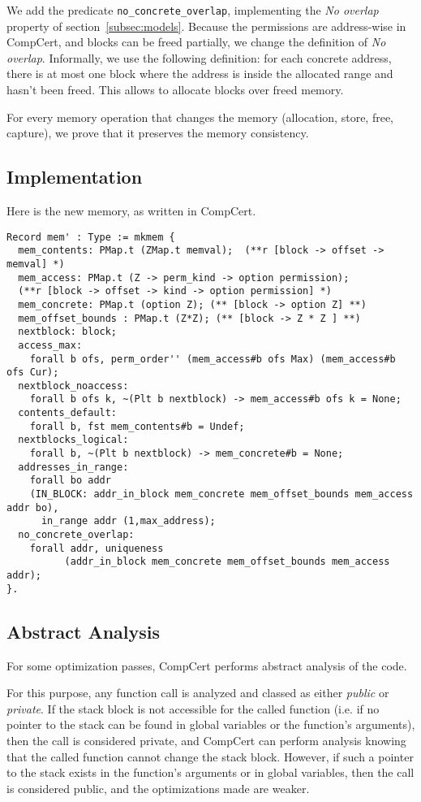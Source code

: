 We add the predicate \texttt{no\_concrete\_overlap}, implementing the \textit{No overlap} property of section~\ref{subsec:models}. Because the permissions are address-wise in CompCert, and blocks can be freed partially, we change the definition of \textit{No overlap}. Informally, we use the following definition: for each concrete address, there is at most one block where the address is inside the allocated range and hasn't been freed. This allows to allocate blocks over freed memory.

For every memory operation that changes the memory (allocation, store, free, capture), we prove that it preserves the memory consistency.

\subsection{Implementation}
Here is the new memory, as written in CompCert. 
{\footnotesize
\begin{lstlisting}
Record mem' : Type := mkmem {
  mem_contents: PMap.t (ZMap.t memval);  (**r [block -> offset -> memval] *)
  mem_access: PMap.t (Z -> perm_kind -> option permission);
  (**r [block -> offset -> kind -> option permission] *)
  mem_concrete: PMap.t (option Z); (** [block -> option Z] **)
  mem_offset_bounds : PMap.t (Z*Z); (** [block -> Z * Z ] **)
  nextblock: block;
  access_max:
    forall b ofs, perm_order'' (mem_access#b ofs Max) (mem_access#b ofs Cur);
  nextblock_noaccess:
    forall b ofs k, ~(Plt b nextblock) -> mem_access#b ofs k = None;
  contents_default:
    forall b, fst mem_contents#b = Undef;
  nextblocks_logical:
    forall b, ~(Plt b nextblock) -> mem_concrete#b = None;
  addresses_in_range:
    forall bo addr
    (IN_BLOCK: addr_in_block mem_concrete mem_offset_bounds mem_access addr bo),
      in_range addr (1,max_address);
  no_concrete_overlap:
    forall addr, uniqueness
          (addr_in_block mem_concrete mem_offset_bounds mem_access addr);
}.
\end{lstlisting}}


\subsection{Abstract Analysis}

For some optimization passes, CompCert performs abstract analysis of the code.

For this purpose, any function call is analyzed and classed as either \textit{public} or \textit{private}. If the stack block is not accessible for the called function (i.e. if no pointer to the stack can be found in global variables or the function's arguments), then the call is considered private, and CompCert can perform analysis knowing that the called function cannot change the stack block. However, if such a pointer to the stack exists in the function's arguments or in global variables, then the call is considered public, and the optimizations made are weaker.

